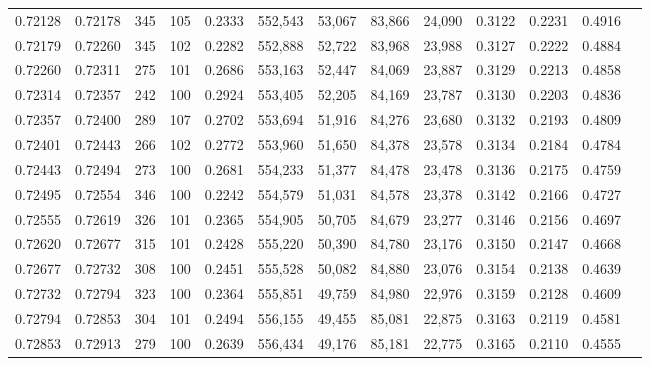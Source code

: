 \begin{tabular}{rrrrrrrrrrrrr}
0.72128 & 0.72178 &   345 & 105 &                                     0.2333 & 552,543 &  53,067 &  83,866 &  24,090 & 0.3122 & 0.2231 & 0.4916 \\
0.72179 & 0.72260 &   345 & 102 &                                     0.2282 & 552,888 &  52,722 &  83,968 &  23,988 & 0.3127 & 0.2222 & 0.4884 \\
0.72260 & 0.72311 &   275 & 101 &                                     0.2686 & 553,163 &  52,447 &  84,069 &  23,887 & 0.3129 & 0.2213 & 0.4858 \\
0.72314 & 0.72357 &   242 & 100 &                                     0.2924 & 553,405 &  52,205 &  84,169 &  23,787 & 0.3130 & 0.2203 & 0.4836 \\
0.72357 & 0.72400 &   289 & 107 &                                     0.2702 & 553,694 &  51,916 &  84,276 &  23,680 & 0.3132 & 0.2193 & 0.4809 \\
0.72401 & 0.72443 &   266 & 102 &                                     0.2772 & 553,960 &  51,650 &  84,378 &  23,578 & 0.3134 & 0.2184 & 0.4784 \\
0.72443 & 0.72494 &   273 & 100 &                                     0.2681 & 554,233 &  51,377 &  84,478 &  23,478 & 0.3136 & 0.2175 & 0.4759 \\
0.72495 & 0.72554 &   346 & 100 &                                     0.2242 & 554,579 &  51,031 &  84,578 &  23,378 & 0.3142 & 0.2166 & 0.4727 \\
0.72555 & 0.72619 &   326 & 101 &                                     0.2365 & 554,905 &  50,705 &  84,679 &  23,277 & 0.3146 & 0.2156 & 0.4697 \\
0.72620 & 0.72677 &   315 & 101 &                                     0.2428 & 555,220 &  50,390 &  84,780 &  23,176 & 0.3150 & 0.2147 & 0.4668 \\
0.72677 & 0.72732 &   308 & 100 &                                     0.2451 & 555,528 &  50,082 &  84,880 &  23,076 & 0.3154 & 0.2138 & 0.4639 \\
0.72732 & 0.72794 &   323 & 100 &                                     0.2364 & 555,851 &  49,759 &  84,980 &  22,976 & 0.3159 & 0.2128 & 0.4609 \\
0.72794 & 0.72853 &   304 & 101 &                                     0.2494 & 556,155 &  49,455 &  85,081 &  22,875 & 0.3163 & 0.2119 & 0.4581 \\
0.72853 & 0.72913 &   279 & 100 &                                     0.2639 & 556,434 &  49,176 &  85,181 &  22,775 & 0.3165 & 0.2110 & 0.4555 \\

\end{tabular}
